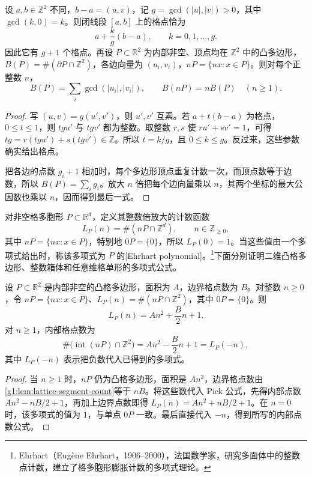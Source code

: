 \begin{lemma}
	\label{g1:lem:lattice-segment-count}
	设 \(a,b\in\mathbb Z^2\) 不同，\(b-a=(u,v)\)，记 \(g=\gcd(|u|,|v|)>0\)，其中 \(\gcd(k,0)=k\)。则闭线段 \([a,b]\) 上的格点恰为
	\[
		a+\frac{k}{g}(b-a),\qquad k=0,1,\ldots,g.
	\]
	因此它有 \(g+1\) 个格点。再设 \(P\subset\mathbb R^2\) 为内部非空、顶点均在 \(\mathbb Z^2\) 中的凸多边形，\(B(P)=\#(\partial P\cap\mathbb Z^2)\)，各边向量为 \((u_i,v_i)\)，\(nP=\{nx:x\in P\}\)。则对每个正整数 \(n\)，
	\[
		B(P)=\sum_i\gcd(|u_i|,|v_i|),\qquad
		B(nP)=nB(P)\quad(n\ge1).
	\]
\end{lemma}
\begin{proof}
	写 \((u,v)=g(u',v')\)，则 \(u',v'\) 互素。若 \(a+t(b-a)\) 为格点，\(0\le t\le1\)，则 \(tgu'\) 与 \(tgv'\) 都为整数。取整数 \(r,s\) 使 \(ru'+sv'=1\)，可得 \(tg=r(tgu')+s(tgv')\in\mathbb Z\)。所以 \(t=k/g\)，且 \(0\le k\le g\)。反过来，这些参数确实给出格点。

	把各边的点数 \(g_i+1\) 相加时，每个多边形顶点重复计数一次，而顶点数等于边数，所以 \(B(P)=\sum_i g_i\)。放大 \(n\) 倍把每个边向量乘以 \(n\)，其两个坐标的最大公因数也乘以 \(n\)，因而得到最后一式。
\end{proof}

对非空格多胞形 \(P\subset\mathbb R^d\)，定义其整数倍放大的计数函数
\[
	L_P(n)=\#(nP\cap\mathbb Z^d),\qquad n\in\mathbb Z_{\ge0},
\]
其中 \(nP=\{nx:x\in P\}\)，特别地 \(0P=\{0\}\)，所以 \(L_P(0)=1\)。当这些值由一个多项式给出时，称该多项式为 \(P\) 的[Ehrhart polynomial]。\footnote{Ehrhart（Eugène Ehrhart，1906--2000），法国数学家，研究多面体中的整数点计数，建立了格多胞形膨胀计数的多项式理论。}下面分别证明二维凸格多边形、整数箱体和任意维格单形的多项式公式。

\begin{proposition}[二维 Ehrhart 公式]
	\label{g1:prop:polygon-ehrhart}
	设 \(P\subset\mathbb R^2\) 是内部非空的凸格多边形，面积为 \(A\)，边界格点数为 \(B\)。对整数 \(n\ge0\)，令 \(nP=\{nx:x\in P\}\)、\(L_P(n)=\#(nP\cap\mathbb Z^2)\)，其中 \(0P=\{0\}\)。则
	\begin{equation}
		\label{g1:eq:polygon-ehrhart}
		L_P(n)=An^2+\frac B2n+1.
	\end{equation}
	对 \(n\ge1\)，内部格点数为
	\[
		\#\bigl(\operatorname{int}(nP)\cap\mathbb Z^2\bigr)
		=An^2-\frac B2n+1=L_P(-n),
	\]
	其中 \(L_P(-n)\) 表示把负数代入已得到的多项式。
\end{proposition}
\begin{proof}
	当 \(n\ge1\) 时，\(nP\) 仍为凸格多边形，面积是 \(An^2\)，边界格点数由\cref{g1:lem:lattice-segment-count}等于 \(nB\)。将这些数代入 Pick 公式，先得内部点数 \(An^2-nB/2+1\)，再加上边界点数即得 \(L_P(n)=An^2+nB/2+1\)。在 \(n=0\) 时，该多项式的值为 \(1\)，与单点 \(0P\) 一致。最后直接代入 \(-n\)，得到所写的内部点数公式。
\end{proof}

